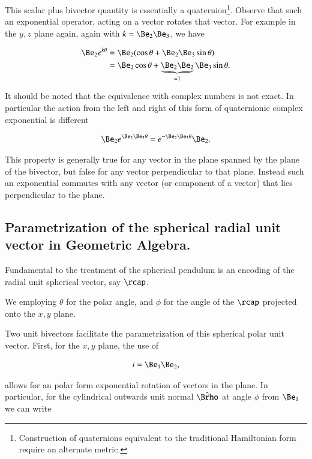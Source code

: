 This scalar plus bivector quantity is essentially a quaternion\footnote{Construction of quaternions equivalent to the traditional Hamiltonian form require an alternate metric.}.  Observe that such an exponential operator, acting on a vector rotates that vector.  For example in the $y,z$ plane again, again with $k = \Be_2 \Be_3$, we have

\begin{align*}
\Be_2 e^{k \theta} 
&=
\Be_2 (\cos\theta + \Be_2 \Be_3 \sin\theta) \\
&=
\Be_2 \cos\theta + \underbrace{\Be_2 \Be_2}_{=1} \Be_3 \sin\theta.
\end{align*}

It should be noted that the equivalence with complex numbers is not exact.  In particular the action from the left and right of this form of quaternionic complex exponential is different

\begin{align}\label{eqn:gaMintro:mp40}
\Be_2 e^{\Be_2 \Be_3 \theta} = e^{-\Be_2 \Be_3 \theta} \Be_2.
\end{align}

This property is generally true for any vector in the plane spanned by the plane of the bivector, but false for any vector perpendicular to that plane.  Instead such an exponential commutes with any vector (or component of a vector) that lies perpendicular to the plane.

\subsection{Parametrization of the spherical radial unit vector in Geometric Algebra.}

Fundamental to the treatment of the spherical pendulum is an encoding of the radial unit spherical vector, say $\rcap$.

We employing $\theta$ for the polar angle, and $\phi$ for the angle of the $\rcap$ projected onto the $x,y$ plane.

Two unit bivectors facilitate the parametrization of this spherical polar unit vector.  First, for the $x,y$ plane, the use of

\begin{align}\label{eqn:gaMintro:mp50}
i = \Be_1 \Be_2,
\end{align}

allows for an polar form exponential rotation of vectors in the plane.  In particular, for the cylindrical outwards unit normal $\hat{\Brho}$ at angle $\phi$ from $\Be_1$ we can write

